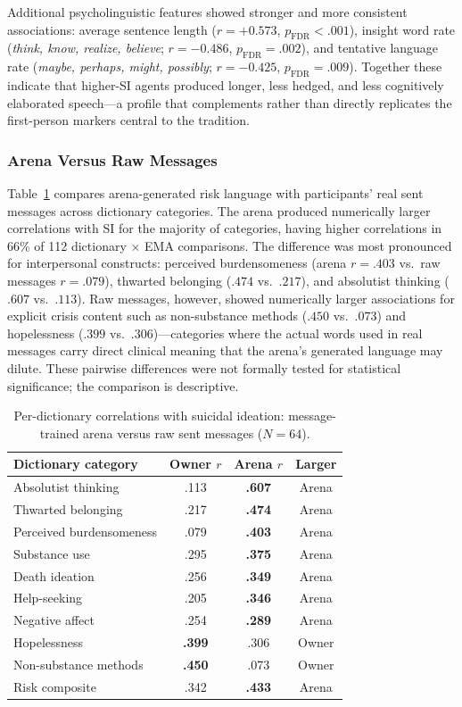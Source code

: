 \documentclass[review,12pt,authoryear]{elsarticle}
\begin{document}
Additional psycholinguistic features showed stronger and more consistent associations: average sentence length ($r = +0.573$, $p_{\text{FDR}} < .001$), insight word rate (\textit{think, know, realize, believe}; $r = -0.486$, $p_{\text{FDR}} = .002$), and tentative language rate (\textit{maybe, perhaps, might, possibly}; $r = -0.425$, $p_{\text{FDR}} = .009$). Together these indicate that higher-SI agents produced longer, less hedged, and less cognitively elaborated speech---a profile that complements rather than directly replicates the first-person markers central to the \citet{stirman2001word} tradition.

\subsubsection{Arena Versus Raw Messages}

Table~\ref{tab:arena_vs_raw} compares arena-generated risk language with participants' real sent messages across dictionary categories. The arena produced numerically larger correlations with SI for the majority of categories, having higher correlations in 66\% of 112 dictionary $\times$ EMA comparisons. The difference was most pronounced for interpersonal constructs: perceived burdensomeness (arena $r = .403$ vs.\ raw messages $r = .079$), thwarted belonging ($.474$ vs.\ $.217$), and absolutist thinking ($.607$ vs.\ $.113$). Raw messages, however, showed numerically larger associations for explicit crisis content such as non-substance methods ($.450$ vs.\ $.073$) and hopelessness ($.399$ vs.\ $.306$)---categories where the actual words used in real messages carry direct clinical meaning that the arena's generated language may dilute. These pairwise differences were not formally tested for statistical significance; the comparison is descriptive.

\begin{table}[H]
\centering
\caption{Per-dictionary correlations with suicidal ideation: message-trained arena versus raw sent messages ($N = 64$).}
\label{tab:arena_vs_raw}
\small
\begin{tabular}{lccc}
\toprule
Dictionary category & Owner $r$ & Arena $r$ & Larger \\
\midrule
Absolutist thinking & .113 & \textbf{.607} & Arena \\
Thwarted belonging & .217 & \textbf{.474} & Arena \\
Perceived burdensomeness & .079 & \textbf{.403} & Arena \\
Substance use & .295 & \textbf{.375} & Arena \\
Death ideation & .256 & \textbf{.349} & Arena \\
Help-seeking & .205 & \textbf{.346} & Arena \\
Negative affect & .254 & \textbf{.289} & Arena \\
Hopelessness & \textbf{.399} & .306 & Owner \\
Non-substance methods & \textbf{.450} & .073 & Owner \\
\midrule
Risk composite & .342 & \textbf{.433} & Arena \\
\bottomrule
\end{tabular}
\end{table}
\end{document}
